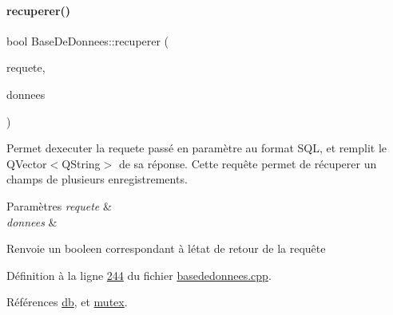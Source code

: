 \paragraph{\texorpdfstring{recuperer()}{recuperer()}\hspace{0.1cm}{\footnotesize\ttfamily [3/4]}}
{\footnotesize\ttfamily bool Base\+De\+Donnees\+::recuperer (\begin{DoxyParamCaption}\item[{Q\+String}]{requete,  }\item[{Q\+Vector$<$ Q\+String $>$ \&}]{donnees }\end{DoxyParamCaption})}



Permet d\textquotesingle{}executer la requete passé en paramètre au format S\+QL, et remplit le Q\+Vector$<$\+Q\+String$>$ de sa réponse. Cette requête permet de récuperer un champs de plusieurs enregistrements. 


\begin{DoxyParams}{Paramètres}
{\em requete} & \\
\hline
{\em donnees} & \\
\hline
\end{DoxyParams}
\begin{DoxyReturn}{Renvoie}
un booleen correspondant à l\textquotesingle{}état de retour de la requête 
\end{DoxyReturn}


Définition à la ligne \hyperlink{basededonnees_8cpp_source_l00244}{244} du fichier \hyperlink{basededonnees_8cpp_source}{basededonnees.\+cpp}.



Références \hyperlink{basededonnees_8h_source_l00030}{db}, et \hyperlink{basededonnees_8h_source_l00031}{mutex}.


